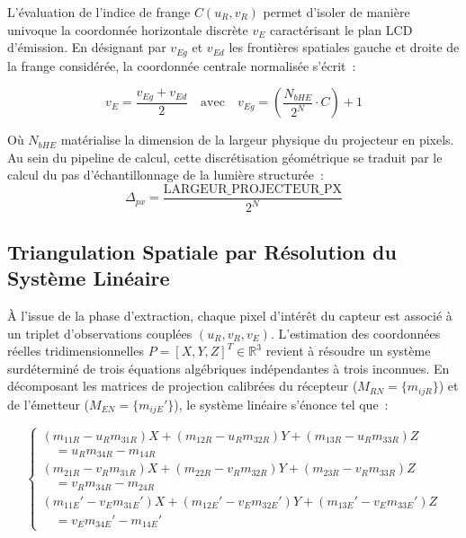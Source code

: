 \documentclass[10pt]{article} %
\begin{document}
L'évaluation de l'indice de frange $C(u_R, v_R)$ permet d'isoler de manière univoque la coordonnée horizontale discrète $v_E$ caractérisant le plan LCD d'émission. En désignant par $v_{Eg}$ et $v_{Ed}$ les frontières spatiales gauche et droite de la frange considérée, la coordonnée centrale normalisée s'écrit~:

\begin{equation}
v_E = \frac{v_{Eg} + v_{Ed}}{2} \quad \text{avec} \quad v_{Eg} = \left(\frac{N_{bHE}}{2^N} \cdot C\right) + 1
\label{eq:coordonnee_ve}
\end{equation}

Où $N_{bHE}$ matérialise la dimension de la largeur physique du projecteur en pixels. Au sein du pipeline de calcul, cette discrétisation géométrique se traduit par le calcul du pas d'échantillonnage de la lumière structurée~:
\begin{equation}
\Delta_{px} = \frac{\text{LARGEUR\_PROJECTEUR\_PX}}{2^N}
\end{equation}

\subsection{Triangulation Spatiale par Résolution du Système Linéaire}
\label{subsec:triangulation}

À l'issue de la phase d'extraction, chaque pixel d'intérêt du capteur est associé à un triplet d'observations couplées $(u_R, v_R, v_E)$. L'estimation des coordonnées réelles tridimensionnelles $P = [X, Y, Z]^T \in \mathbb{R}^3$ revient à résoudre un système surdéterminé de trois équations algébriques indépendantes à trois inconnues. En décomposant les matrices de projection calibrées du récepteur ($M_{RN} = \{m_{ijR}\}$) et de l'émetteur ($M_{EN} = \{m_{ijE}'\}$), le système linéaire s'énonce tel que~:

\begin{equation}
\begin{cases}
(m_{11R} - u_R m_{31R})X + (m_{12R} - u_R m_{32R})Y + (m_{13R} - u_R m_{33R})Z \\
\quad = u_R m_{34R} - m_{14R} \\
(m_{21R} - v_R m_{31R})X + (m_{22R} - v_R m_{32R})Y + (m_{23R} - v_R m_{33R})Z \\
\quad = v_R m_{34R} - m_{24R} \\
(m_{11E}' - v_E m_{31E}')X + (m_{12E}' - v_E m_{32E}')Y + (m_{13E}' - v_E m_{33E}')Z \\
\quad = v_E m_{34E}' - m_{14E}'
\end{cases}
\label{eq:systeme_triangulation}
\end{equation}
\end{document}
